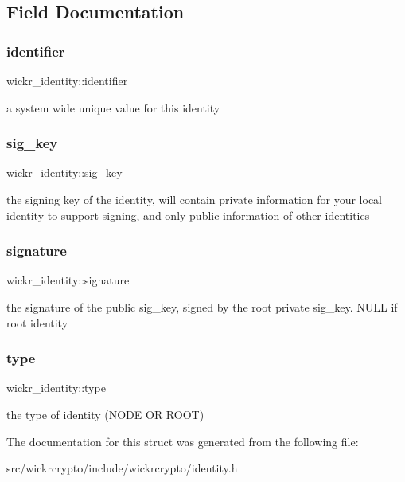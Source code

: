 \subsection{Field Documentation}
\mbox{\label{structwickr__identity_aed3657b22d83bb810b51ea1d1520b23e}} 
\subsubsection{\texorpdfstring{identifier}{identifier}}
{\footnotesize\ttfamily wickr\+\_\+identity\+::identifier}

a system wide unique value for this identity \mbox{\label{structwickr__identity_a788a08ac03576cb76d9b2eaf81a7af3e}} 
\subsubsection{\texorpdfstring{sig\+\_\+key}{sig\_key}}
{\footnotesize\ttfamily wickr\+\_\+identity\+::sig\+\_\+key}

the signing key of the identity, will contain private information for your local identity to support signing, and only public information of other identities \mbox{\label{structwickr__identity_afb6bd9f5f9707be10fb273ce8d0b5928}} 
\subsubsection{\texorpdfstring{signature}{signature}}
{\footnotesize\ttfamily wickr\+\_\+identity\+::signature}

the signature of the public \textquotesingle{}sig\+\_\+key\textquotesingle{}, signed by the root private \textquotesingle{}sig\+\_\+key\textquotesingle{}. N\+U\+LL if root identity \mbox{\label{structwickr__identity_a685dae977849c05c84ee4a0b10c9396d}} 
\subsubsection{\texorpdfstring{type}{type}}
{\footnotesize\ttfamily wickr\+\_\+identity\+::type}

the type of identity (N\+O\+DE OR R\+O\+OT) 

The documentation for this struct was generated from the following file\+:\begin{DoxyCompactItemize}
\item 
src/wickrcrypto/include/wickrcrypto/identity.\+h\end{DoxyCompactItemize}
